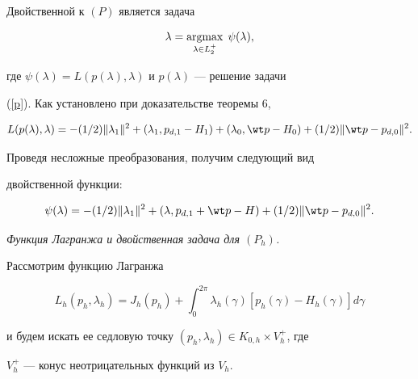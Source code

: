 Двойственной к $(P)$ является задача


\begin{equation}\label {dual1}


\lambda= \argmax\limits_{\lambda \in {L_{2}^{+}}}\; \psi(\lambda),


\end{equation}


где $ \psi(\lambda)=L(p(\lambda),\lambda)$ и $p(\lambda)$ --- решение задачи


(\ref{p}). Как установлено при доказательстве теоремы 6,


$$


L(p(\lambda),\lambda)=-(1/2)\|\lambda_{1}\|^2+(\lambda_{1},p_{d,1}


-H_{1})+ (\lambda_{0},\wt p-H_{0})+(1/2)\| \wt p-p_{d,0}\|^{2}.


$$


Проведя несложные преобразования, получим следующий вид


двойственной функции:


\begin{equation}\label{real-dual}


\psi(\lambda)=-(1/2)\|\lambda_{1}\|^2+(\lambda,p_{d,1}+\wt


p -H)+ (1/2)\| \wt p-p_{d,0}\|^{2}.


\end{equation}


\medskip





{\it Функция Лагранжа и двойственная задача для $(P_h)$.}


Рассмотрим функцию Лагранжа


$$




L_h(p_h,\lambda_h)= J_h(p_h) +


\int_{0}^{2\pi} \lambda_h(\gamma)[p_h(\gamma)-H_h(\gamma)]d\gamma




$$


и будем искать ее седловую точку $(p_h,\lambda_h) \in


K_{0,h}\times V_h^{+}$, где


$V_h^{+}$ --- конус неотрицательных функций из $V_h$.





